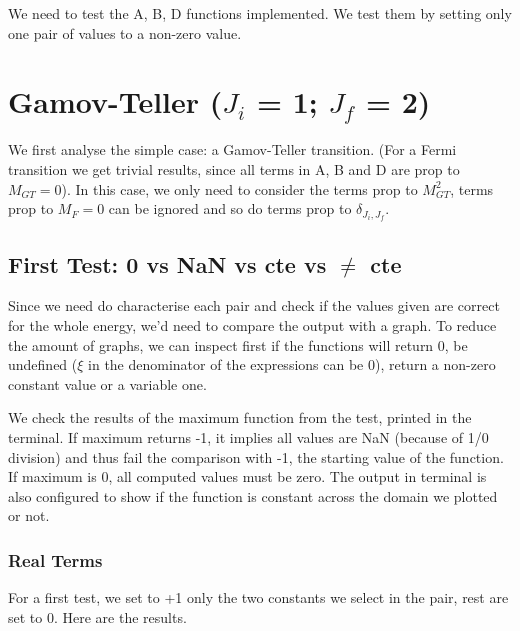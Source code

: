 \documentclass[twocolumn]{article}
\title{}
\author{}
\begin{document}
\maketitle

We need to test the A, B, D functions implemented. We test them by setting only one pair of values to a non-zero value.

\section{Gamov-Teller ($J_i$ = 1; $J_f$ = 2)}

We first analyse the simple case: a Gamov-Teller transition. (For a Fermi transition we get trivial results, since all terms in A, B and D are prop to $M_{GT} = 0$). In this case, we only need to consider the terms prop to $M^2_{GT}$, terms prop to $M_F = 0$ can be ignored and so do terms prop to $\delta_{J_i,J_f}$. 

\subsection{First Test: 0 vs NaN vs cte vs $\neq$ cte}

Since we need do characterise each pair and check if the values given are correct for the whole energy, we'd need to compare the output with a graph. To reduce the amount of graphs, we can inspect first if the functions will return 0, be undefined ($\xi$ in the denominator of the expressions can be 0), return a non-zero constant value or a variable one. 

We check the results of the maximum function from the test, printed in the terminal. If maximum returns -1, it implies all values are NaN (because of 1/0 division) and thus fail the comparison with -1, the starting value of the function. If maximum is 0, all computed values must be zero. The output in terminal is also configured to show if the function is constant across the domain we plotted or not.

\subsubsection{Real Terms}

For a first test, we set to +1 only the two constants we select in the pair, rest are set to 0. Here are the results.
\end{document}
